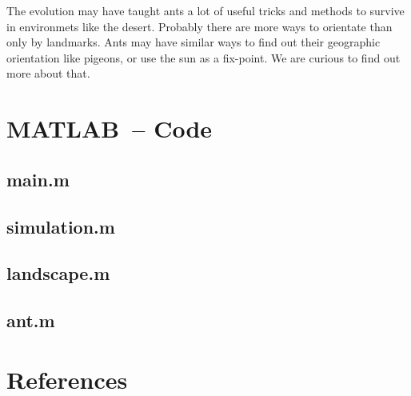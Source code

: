 \documentclass[11pt]{article}
\begin{document}
The evolution may have taught ants a lot of useful tricks and methods to survive in environmets like the desert. Probably there are more ways to orientate than only by landmarks. Ants may have similar ways to find out their geographic orientation like pigeons, or use the sun as a fix-point. We are curious to find out more about that.


\newpage
\section{MATLAB\texttrademark\ -- Code}
\subsection{main.m}

\subsection{simulation.m}

\subsection{landscape.m}

\subsection{ant.m}


\newpage
\section{References}




\newpage
\listoffigures
\end{document}

